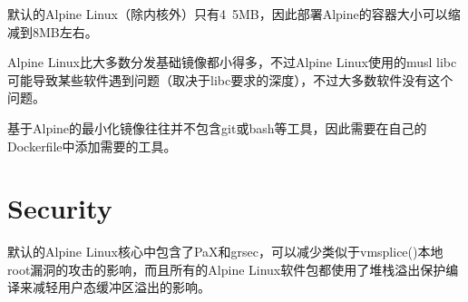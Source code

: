 默认的Alpine Linux（除内核外）只有4~5MB，因此部署Alpine的容器大小可以缩减到8MB左右。

Alpine Linux比大多数分发基础镜像都小得多，不过Alpine Linux使用的musl libc可能导致某些软件遇到问题（取决于libc要求的深度），不过大多数软件没有这个问题。

基于Alpine的最小化镜像往往并不包含git或bash等工具，因此需要在自己的Dockerfile中添加需要的工具。


\section{Security}

默认的Alpine Linux核心中包含了PaX和grsec，可以减少类似于vmsplice()本地root漏洞的攻击的影响，而且所有的Alpine Linux软件包都使用了堆栈溢出保护编译来减轻用户态缓冲区溢出的影响。





